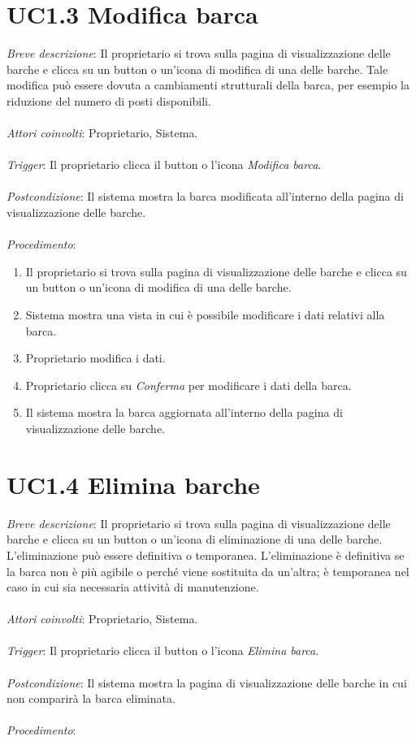 \section{UC1.3 Modifica barca}

\emph{Breve descrizione}: Il proprietario si trova sulla pagina di visualizzazione delle barche e clicca su un button o un'icona di modifica di una delle barche.
Tale modifica può essere dovuta a cambiamenti strutturali della barca, per esempio la riduzione del numero di posti disponibili.
\\\\
\emph{Attori coinvolti}: Proprietario, Sistema.\\\\
\emph{Trigger}: Il proprietario clicca il button o l'icona \textit{Modifica barca}.\\\\
\emph{Postcondizione}: Il sistema mostra la barca modificata all'interno della pagina di visualizzazione delle barche.\\\\
\emph{Procedimento}:

\begin{enumerate}
    \item Il proprietario si trova sulla pagina di visualizzazione delle barche e clicca su un button o un'icona di modifica di una delle barche.
    \item Sistema mostra una vista in cui è possibile modificare i dati relativi alla barca.
    \item Proprietario modifica i dati.
    \item Proprietario clicca su \textit{Conferma} per modificare i dati della barca.
    \item Il sistema mostra la barca aggiornata all'interno della pagina di visualizzazione delle barche.
\end{enumerate}

\section{UC1.4 Elimina barche}

\emph{Breve descrizione}: Il proprietario si trova sulla pagina di visualizzazione delle barche e clicca su un button o un'icona di eliminazione di una delle barche.
L'eliminazione può essere definitiva o temporanea. L'eliminazione è definitiva se la barca non è più agibile o perché viene sostituita da un'altra;
è temporanea nel caso in cui sia necessaria attività di manutenzione.\\\\
\emph{Attori coinvolti}: Proprietario, Sistema.\\\\
\emph{Trigger}: Il proprietario clicca il button o l'icona \textit{Elimina barca}.\\\\
\emph{Postcondizione}: Il sistema mostra la pagina di visualizzazione delle barche in cui non comparirà la barca eliminata.\\\\
\emph{Procedimento}:

